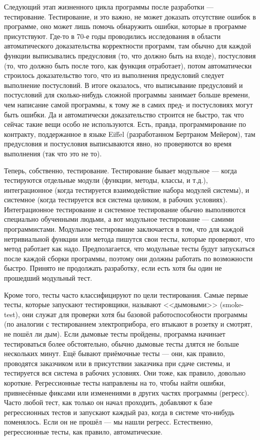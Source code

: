 \documentclass[a5paper]{article}
\begin{document}
Следующий этап жизненного цикла программы после разработки --- тестирование. Тестирование, и это важно, не может доказать отсутствие ошибок в программе, оно может лишь помочь обнаружить ошибки, которые в программе присутствуют. Где-то в 70-е годы проводились исследования в области автоматического доказательства корректности программ, там обычно для каждой функции выписывались предусловия (то, что должно быть на входе), постусловия (то, что должно быть после того, как функция отработает), потом автоматически строилось доказательство того, что из выполнения предусловий следует выполнение постусловий. В итоге оказалось, что выписывание предусловий и постусловий для сколько-нибудь сложной программы занимает больше времени, чем написание самой программы, к тому же в самих пред- и постусловиях могут быть ошибки. Да и автоматически доказательство строится не быстро, так что сейчас такие вещи особо не используются. Есть, правда, программирование по контракту, поддержанное в языке Eiffel (разработанном Бертраном Мейером), там предусловия и постусловия выписываются явно, но проверяются во время выполнения (так что это не то).

Теперь, собственно, тестирование. Тестирование бывает модульное --- когда тестируются отдельные модули (функции, методы, классы, и т.д.), интеграционное (когда тестируется взаимодействие набора модулей системы), и системное (когда тестируется вся система целиком, в рабочих условиях). Интеграционное тестирование и системное тестирование обычно выполняются специально обученными людьми, а вот модульное тестирование --- самими программистами. Модульное тестирование заключается в том, что для каждой нетривиальной функции или метода пишутся свои тесты, которые проверяют, что метод работает как надо. Предполагается, что модульные тесты будут запускаться после каждой сборки программы, поэтому они должны работать по возможности быстро. Принято не продолжать разработку, если есть хотя бы один не прошедший модульный тест.

Кроме того, тесты часто классифицируют по цели тестирования. Самые первые тесты, которые запускают тестировщики, называют <<дымовыми>> (smoke-test), они служат для проверки хотя бы базовой работоспособности программы (по аналогии с тестированием электроприбора, его втыкают в розетку и смотрят, не пошёл ли дым). Если дымовые тесты пройдены, программа начинает тестироваться более обстоятельно, обычно дымовые тесты длятся не больше нескольких минут. Ещё бывают приёмочные тесты --- они, как правило, проводятся заказчиком или в присутствии заказчика при сдаче системы, и тестируется вся система в рабочих условиях. Они тоже, как правило, довольно короткие. Регрессионные тесты направлены на то, чтобы найти ошибки, привнесённые фиксами или изменениями в других частях программы (регресс). Часто любой тест, как только он начал проходить, добавляют к базе регрессионных тестов и запускают каждый раз, когда в системе что-нибудь поменялось. Если он не прошёл --- мы нашли регресс. Естественно, регрессионные тесты, как правило, автоматические.
\end{document}
